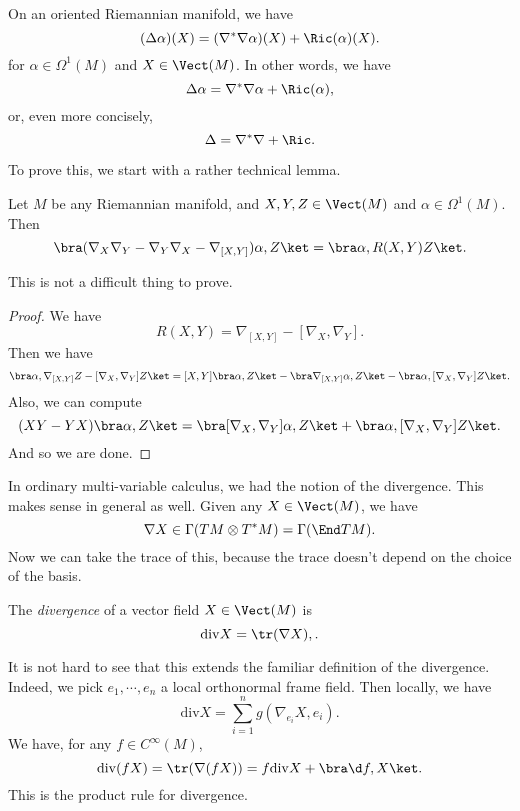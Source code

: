 \documentclass[a4paper]{article}
\renewcommand\div{\mathrm{div}}
\begin{document}
\begin{thm}
  On an oriented Riemannian manifold, we have
  \[
    (\Delta \alpha)(X) = (\nabla^* \nabla \alpha)(X) + \Ric(\alpha)(X).
  \]
  for $\alpha \in \Omega^1(M)$ and $X \in \Vect(M)$. In other words, we have
  \[
    \Delta \alpha = \nabla^*\nabla \alpha + \Ric(\alpha), %
  \]
  or, even more concisely,
  \[
    \Delta = \nabla^* \nabla + \Ric.
  \]
\end{thm}

To prove this, we start with a rather technical lemma.
\begin{lemma}
  Let $M$ be any Riemannian manifold, and $X, Y, Z \in \Vect(M)$ and $\alpha \in \Omega^1(M)$. Then
  \[
    \bra (\nabla_X \nabla_Y - \nabla_Y \nabla_X - \nabla_{[X, Y]})\alpha, Z\ket = \bra \alpha, R(X, Y) Z\ket.
  \]
\end{lemma}
This is not a difficult thing to prove.

\begin{proof}
  We have
  \[
    R(X, Y) = \nabla_{[X, Y]} - [\nabla_X, \nabla_Y].
  \]
  Then we have
  \[
    \bra \alpha, \nabla_{[X, Y]} Z - [\nabla_X, \nabla_Y] Z\ket = [X, Y] \bra \alpha, Z\ket - \bra \nabla_{[X, Y]}\alpha, Z\ket - \bra \alpha, [\nabla_X, \nabla_Y]Z\ket.
  \]
  Also, we can compute
  \[
    (XY - YX) \bra \alpha, Z\ket = \bra [\nabla_X, \nabla_Y]\alpha, Z\ket + \bra \alpha, [\nabla_X, \nabla_Y] Z\ket.
  \]
  And so we are done.
\end{proof}

In ordinary multi-variable calculus, we had the notion of the divergence. This makes sense in general as well. Given any $X \in \Vect(M)$, we have
\[
  \nabla X \in \Gamma(TM \otimes T^*M) = \Gamma(\End TM).
\]
Now we can take the trace of this, because the trace doesn't depend on the choice of the basis.
\begin{defi}[Divergence]
  The \emph{divergence} of a vector field $X \in \Vect(M)$ is
  \[
    \div X = \tr (\nabla X),.
  \]
\end{defi}
It is not hard to see that this extends the familiar definition of the divergence. Indeed, we pick $e_1, \cdots, e_n$ a local orthonormal frame field. Then locally, we have
\[
  \div X = \sum_{i = 1}^n g(\nabla_{e_i} X, e_i).
\]
We have, for any $f \in C^\infty(M)$,
\[
  \div (fX) = \tr(\nabla (fX)) = f \div X + \bra \d f, X\ket.
\]
This is the product rule for divergence.
\end{document}
